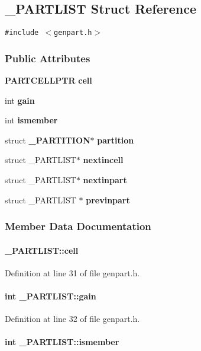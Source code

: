 \subsection{\_\-PARTLIST  Struct Reference}
\label{_PARTLIST}
{\tt \#include $<$genpart.h$>$}

\subsubsection*{Public Attributes}
\begin{CompactItemize}
\item 
{\bf PARTCELLPTR} {\bf cell}
\item 
int {\bf gain}
\item 
int {\bf ismember}
\item 
struct {\bf \_\-PARTITION}$\ast$ {\bf partition}
\item 
struct \_\-PARTLIST$\ast$ {\bf nextincell}
\item 
struct \_\-PARTLIST$\ast$ {\bf nextinpart}
\item 
struct \_\-PARTLIST $\ast$ {\bf previnpart}
\end{CompactItemize}


\subsubsection{Member Data Documentation}
\label{_PARTLIST_m0}
\paragraph{ \_\-PARTLIST::cell}\hfill



Definition at line 31 of file genpart.h.\label{_PARTLIST_m1}
\paragraph{\setlength{\rightskip}{0pt plus 5cm}int \_\-PARTLIST::gain}\hfill



Definition at line 32 of file genpart.h.\label{_PARTLIST_m2}
\paragraph{\setlength{\rightskip}{0pt plus 5cm}int \_\-PARTLIST::ismember}\hfill



